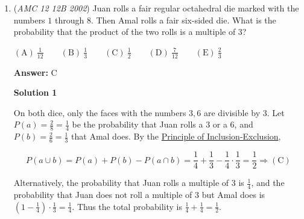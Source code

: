 \begin{enumerate}
 IronicNinja~

 



\textbf{Solution 2}

Let Let $a$ denote the leftmost digit of $N$ and let $x$ denote the three-digit number obtained by removing $a$. Then $N=1000a+x=9x$ and it follows that $1000a=8x$. Dividing both sides by 8 yields $125a=x$. All the values of $a$ in the range 1 to 7 result in three-digit numbers, hence there are $\boxed{D)7}$ values for $N$.

 $\sim$Glowworm

 



\textbf{Solution 3 (cases)}

Let $a, b, c, d$ denote the number $\overline{abcd}$. If $a = 1$, $\overline{abcd} - 1000 = \frac{\overline{abcd}}{9}$. Clearly, $\overline{abcd} = 1125$. Doing the same for 2 yields $2250$, and 3 gives $3375$. Clearly there is a pattern of adding 125, which works up until 7, after which we get $9000$ which clearly doesn't work. Therefore, there are $\boxed {D) 7}$ valid solutions, those being:$1125, 2250, 3375, 4500, 5625, 6750, 7875$.

 


	\item (\textit{AMC 12 12B 2002}) Juan rolls a fair regular octahedral die marked with the numbers $1$ through $8$. Then Amal rolls a fair six-sided die. What is the probability that the product of the two rolls is a multiple of 3?


 $\mathrm{(A)}\ \frac1{12} \qquad\mathrm{(B)}\ \frac 13 \qquad\mathrm{(C)}\ \frac 12 \qquad\mathrm{(D)}\  \frac 7{12} \qquad\mathrm{(E)}\ \frac 23$

 \textbf{Answer: }C



\textbf{Solution 1}

On both dice, only the faces with the numbers $3,6$ are divisible by $3$. Let $P(a) = \frac{2}{8} = \frac{1}{4}$ be the probability that Juan rolls a $3$ or a $6$, and $P(b) = \frac{2}{6} = \frac 13$ that Amal does. By the \href{https://artofproblemsolving.com/wiki/index.php?title=Principle\_of\_Inclusion-Exclusion}{Principle of Inclusion-Exclusion},

 
 \[P(a \cup b) = P(a) + P(b) - P(a \cap b) = \frac{1}{4} + \frac{1}{3} - \frac{1}{4} \cdot \frac{1}{3} = \frac{1}{2} \Rightarrow \mathrm{(C)}\]

 Alternatively, the probability that Juan rolls a multiple of $3$ is $\frac{1}{4}$, and the probability that Juan does not roll a multiple of $3$ but Amal does is $\left(1 - \frac{1}{4}\right) \cdot \frac{1}{3} = \frac{1}{4}$. Thus the total probability is $\frac 14 + \frac 14 = \frac 12$.


\end{enumerate}
